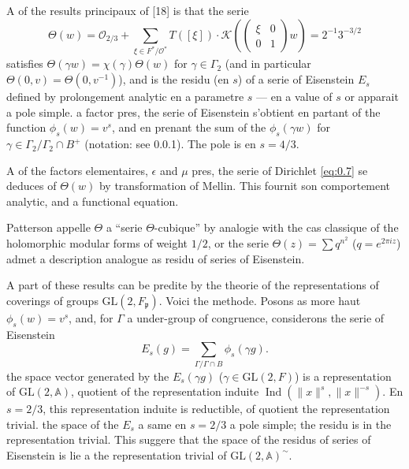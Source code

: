 \documentclass[12pt,a4paper]{article}
\theoremstyle{plain}
\theoremstyle{definition}
\theoremstyle{remark}
\DeclareMathOperator{\Ind}{Ind}
\newcommand{\Af}{\mathbb{A}}
\newcommand{\cO}{\mathcal{O}}
\newcommand{\frakp}{\mathfrak{p}}
\providecommand{\cO}{\mathcal{O}}
\providecommand{\frakp}{\mathfrak{p}}
\begin{document}
A of the results principaux of [18] is that the serie
\begin{equation}\label{eq:0.11}
\Theta(w) = \mathcal{O}_{2/3} + \sum_{\xi \in F^* / \cO^*} T([\xi]) \cdot \mathcal{K}\left(\begin{pmatrix} \xi & 0 \\ 0 & 1 \end{pmatrix} w\right) = 2^{-1} 3^{-3/2}
\tag{0.11}
\end{equation}
satisfies $\Theta(\gamma w) = \chi(\gamma) \Theta(w)$ for $\gamma \in \Gamma_2$ (and in particular $\Theta(0, v) = \Theta(0, v^{-1})$), and is the residu (en $s$) of a serie of Eisenstein $E_s$ defined by prolongement analytic en a parametre $s$ --- en a value of $s$ or apparait a pole simple. a factor pres, the serie of Eisenstein s'obtient en partant of the function $\phi_s(w) = v^s$, and en prenant the sum of the $\phi_s(\gamma w)$ for $\gamma \in \Gamma_2 / \Gamma_2 \cap B^+$ (notation: see 0.0.1). The pole is en $s = 4/3$.

A of the factors elementaires, $\epsilon$ and $\mu$ pres, the serie of Dirichlet \eqref{eq:0.7} se deduces of $\Theta(w)$ by transformation of Mellin. This fournit son comportement analytic, and a functional equation.

Patterson appelle $\Theta$ a ``serie $\Theta$-cubique'' by analogie with the cas classique of the holomorphic modular forms of weight $1/2$, or the serie $\Theta(z) = \sum q^{n^2}$ ($q = e^{2\pi i z}$) admet a description analogue as residu of series of Eisenstein.

A part of these results can be predite by the theorie of the representations of coverings of groups $\mathrm{GL}(2, F_\frakp)$. Voici the methode. Posons as more haut $\phi_s(w) = v^s$, and, for $\Gamma$ a under-group of congruence, considerons the serie of Eisenstein
\[
E_s(g) = \sum_{\Gamma / \Gamma \cap B} \phi_s(\gamma g).
\]
the space vector generated by the $E_s(\gamma g)$ ($\gamma \in \mathrm{GL}(2, F)$) is a representation of $\mathrm{GL}(2, \Af)$, quotient of the representation induite $\Ind(\|x\|^s, \|x\|^{-s})$. En $s = 2/3$, this representation induite is reductible, of quotient the representation trivial. the space of the $E_s$ a same en $s = 2/3$ a pole simple; the residu is in the representation trivial. This suggere that the space of the residus of series of Eisenstein is lie a the representation trivial of $\mathrm{GL}(2, \Af)^\sim$.
\end{document}
